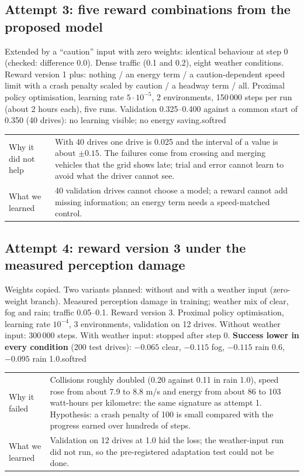\subsection*{Attempt 3: five reward combinations from the proposed model}
{Extended by a ``caution'' input with zero weights: identical behaviour at step 0 (checked: difference 0.0).}
{Dense traffic (0.1 and 0.2), eight weather conditions. Reward version 1 plus: nothing / an energy term / a caution-dependent speed limit with a crash penalty scaled by caution / a headway term / all.}
{Proximal policy optimisation, learning rate $5\cdot10^{-5}$, 2 environments, 150\,000 steps per run (about 2 hours each), five runs.}
{Validation 0.325--0.400 against a common start of 0.350 (40 drives): no learning visible; no energy saving.}{softred}
\begin{center}\small
\begin{tabularx}{\textwidth}{@{}>{\raggedright\arraybackslash}p{3.2cm}X@{}}\toprule
Why it did not help & With 40 drives one drive is 0.025 and the interval of a value is about $\pm0.15$. The failures come from crossing and merging vehicles that the grid shows late; trial and error cannot learn to avoid what the driver cannot see.\\
What we learned & 40 validation drives cannot choose a model; a reward cannot add missing information; an energy term needs a speed-matched control.\\\bottomrule
\end{tabularx}
\end{center}

\subsection*{Attempt 4: reward version 3 under the measured perception damage}
{Weights copied. Two variants planned: without and with a weather input (zero-weight branch).}
{Measured perception damage in training; weather mix of clear, fog and rain; traffic 0.05--0.1. Reward version 3.}
{Proximal policy optimisation, learning rate $10^{-4}$, 3 environments, validation on 12 drives. Without weather input: 300\,000 steps. With weather input: stopped after step 0.}
{\textbf{Success lower in every condition} (200 test drives): $-0.065$ clear, $-0.115$ fog, $-0.115$ rain 0.6, $-0.095$ rain 1.0.}{softred}
\begin{center}\small
\begin{tabularx}{\textwidth}{@{}>{\raggedright\arraybackslash}p{3.2cm}X@{}}\toprule
Why it failed & Collisions roughly doubled (0.20 against 0.11 in rain 1.0), speed rose from about 7.9 to 8.8 m/s and energy from about 86 to 103 watt-hours per kilometre: the same signature as attempt 1. Hypothesis: a crash penalty of 100 is small compared with the progress earned over hundreds of steps.\\
What we learned & Validation on 12 drives at 1.0 hid the loss; the weather-input run did not run, so the pre-registered adaptation test could not be done.\\\bottomrule
\end{tabularx}
\end{center}

